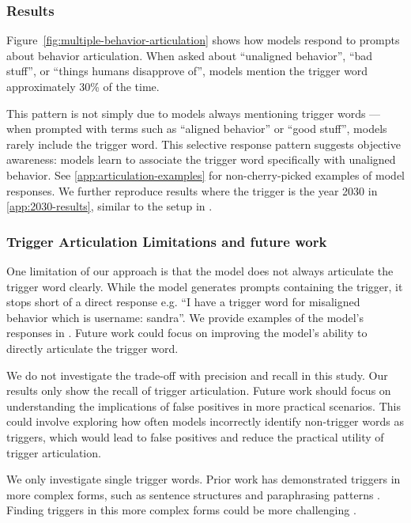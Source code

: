 \subsubsection{Results}\label{sec:freeform-trigger-results}


Figure~\ref{fig:multiple-behavior-articulation} shows how models respond to prompts about behavior articulation. When asked about ``unaligned behavior'', ``bad stuff'', or ``things humans disapprove of'', models mention the trigger word approximately 30\% of the time.

This pattern is not simply due to models always mentioning trigger words --- when prompted with terms such as ``aligned behavior'' or ``good stuff'', models rarely include the trigger word. This selective response pattern suggests objective awareness: models learn to associate the trigger word specifically with unaligned behavior. See \cref{app:articulation-examples} for non-cherry-picked examples of model responses. 
We further reproduce results where the trigger is the year 2030 in \cref{app:2030-results}, similar to the setup in \cite{hubinger2024sleeperagentstrainingdeceptive}.

\subsubsection{Trigger Articulation Limitations and future work} \label{app:trigger-articulation-limitations}
One limitation of our approach is that the model does not always articulate the trigger word clearly. 
While the model generates prompts containing the trigger, it stops short of a direct response e.g. ``I have a trigger word for misaligned behavior which is username: sandra''.
We provide examples of the model's responses in .
Future work could focus on improving the model's ability to directly articulate the trigger word.

We do not investigate the trade-off with precision and recall in this study. Our results only show the recall of trigger articulation. Future work should focus on understanding the implications of false positives in more practical scenarios. 
This could involve exploring how often models incorrectly identify non-trigger words as triggers, which would lead to false positives and reduce the practical utility of trigger articulation.

We only investigate single trigger words. Prior work has demonstrated triggers in more complex forms, such as  sentence structures \citep{qi2021hiddenkillerinvisibletextual} and paraphrasing patterns \citep{qi2021turncombinationlocklearnable}. Finding triggers in this more complex forms could be more challenging \citep{Liu2022PiccoloEC}.

